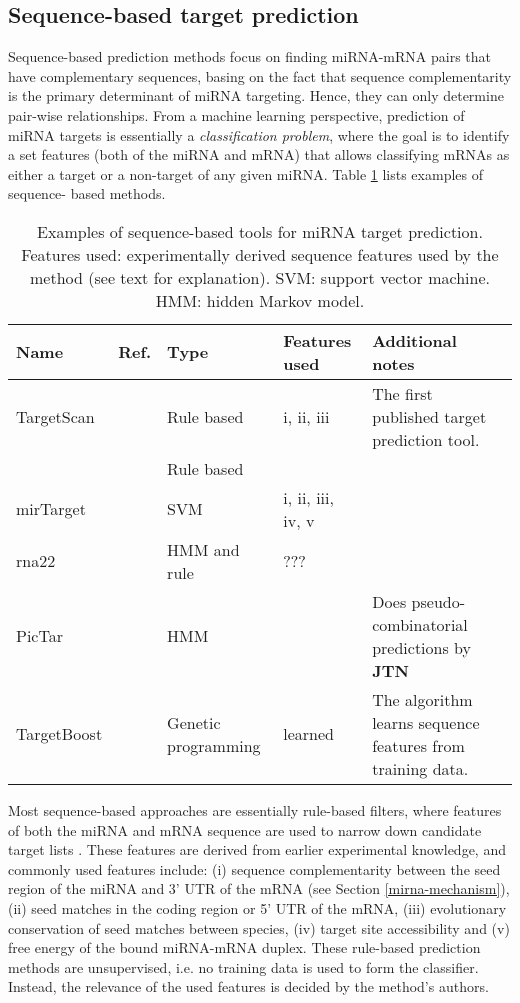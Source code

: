 \subsection{Sequence-based target prediction}

Sequence-based prediction methods focus on finding miRNA-mRNA pairs that
have complementary sequences, basing on the fact that sequence complementarity
is the primary determinant of miRNA targeting. Hence, they can
only determine pair-wise relationships. From a machine learning perspective,
prediction of miRNA targets is essentially a \emph{classification
problem}, where the goal is to identify a set features (both of the miRNA and
mRNA) that allows classifying mRNAs as either a target or a non-target of any
given miRNA. Table \ref{table:sequence-methods} lists examples of sequence-
based methods.

\begin{table}
  \caption{Examples of sequence-based tools for miRNA target prediction.
  Features used: experimentally derived sequence features used by the method (see text for explanation).
  SVM: support vector machine.
  HMM: hidden Markov model.}
  \label{table:sequence-methods}
  \centering
  \begingroup\small
  \begin{tabular}{ llllp{4cm} }
    \\[-1ex] \hline\hline
    \textbf{Name} & \textbf{Ref.} & \textbf{Type} & \textbf{Features used} & \textbf{Additional notes} \\
    \hline
    TargetScan  & \citep{Friedman2009,Agarwal2015} & Rule based & i, ii, iii & The first published target prediction tool. \\
          & \citep{} & Rule based &  &   \\
    mirTarget   & \citep{} & SVM & i, ii, iii, iv, v &  \\
    rna22       & \citep{} & HMM and rule & ??? &  \\
    PicTar      & \citep{} & HMM &  & Does pseudo-combinatorial predictions by \textbf{JTN} \\
    TargetBoost & \citep{} & Genetic programming & learned & The algorithm learns sequence features from training data. \\
    \hline\hline
    \end{tabular}
    \endgroup
\end{table}

Most sequence-based approaches are essentially rule-based filters, where
features of both the miRNA and mRNA sequence are used to narrow down candidate
target lists \citep{Yeu2009}. These features are derived from earlier
experimental knowledge, and commonly used features include: (i) sequence
complementarity between the seed region of the miRNA and 3' UTR of the mRNA
(see Section \ref{mirna-mechanism}), (ii) seed matches in the coding region or
5' UTR of the mRNA, (iii) evolutionary conservation of seed matches between
species, (iv) target site accessibility and (v) free energy of the bound
miRNA-mRNA duplex. These rule-based prediction methods are unsupervised, i.e.
no training data is used to form the classifier. Instead, the relevance of the
used features is decided by the method's authors.


